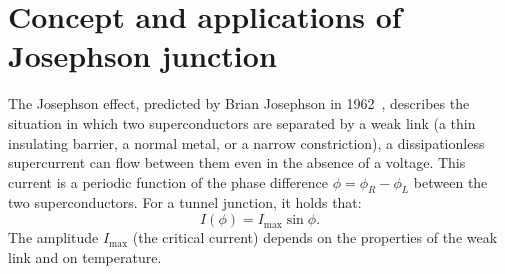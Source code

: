 \documentclass[11pt,a4paper,twoside,openany]{report}
\begin{document}
\section{Concept and applications of Josephson junction}

The Josephson effect, predicted by Brian Josephson in 1962~\cite{josephson_possible_1962}, describes the situation in which two superconductors are separated by a weak link (a thin insulating barrier, a normal metal, or a narrow constriction), a dissipationless supercurrent can flow between them even in the absence of a voltage.  This current is a periodic function of the phase difference \(\phi = \phi_R - \phi_L\) between the two superconductors. For a tunnel junction, it holds that:
\begin{equation}
  I(\phi) = I_{\max} \sin\phi.
\end{equation}
The amplitude \(I_{\max}\) (the critical current) depends on the properties of the weak link and on temperature.
\end{document}
